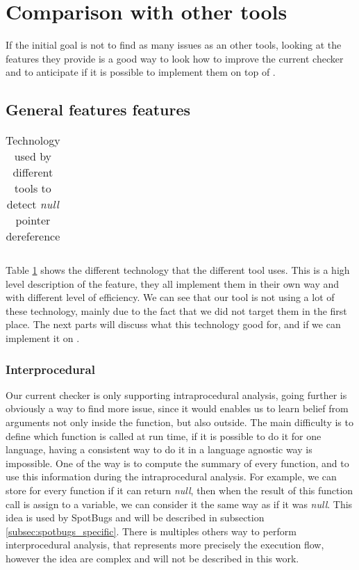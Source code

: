 \section{Comparison with other tools}
\label{sec:comparison}

If the initial goal is not to find as many issues as an other tools, looking at the features they provide is a good way to look how to improve the current checker and to anticipate if it is possible to implement them on top of \slang{}.


\subsection{General features features}
\label{subsec:general_features}

\begin{table}[h]
	\centering
	\caption{Technology used by different tools to detect \emph{null} pointer dereference}
	\label{table:tools_features}
	\begin{tabular}{|c|c|}
		\hline
	\end{tabular}
\end{table}

Table \ref{table:tools_features} shows the different technology that the different tool uses. 
This is a high level description of the feature, they all implement them in their own way and with different level of efficiency. 
We can see that our tool is not using a lot of these technology, mainly due to the fact that we did not target them in the first place. 
The next parts will discuss what this technology good for, and if we can implement it on \slang{}.


\subsubsection{Interprocedural}
\label{subsubsec:inter_procedrual}

Our current checker is only supporting intraprocedural analysis, going further is obviously a way to find more issue, since it would enables us to learn belief from arguments not only inside the function, but also outside. 
The main difficulty is to define which function is called at run time, if it is possible to do it for one language, having a consistent way to do it in a language agnostic way is impossible. One of the way is to compute the summary of every function, and to use this information during the intraprocedural analysis. 
For example, we can store for every function if it can return \emph{null}, then when the result of this function call is assign to a variable, we can consider it the same way as if it was \emph{null}. 
This idea is used by SpotBugs and will be described in subsection \ref{subsec:spotbugs_specific}. 
There is multiples others way to perform interprocedural analysis, that represents more precisely the execution flow, however the idea are complex and will not be described in this work.

